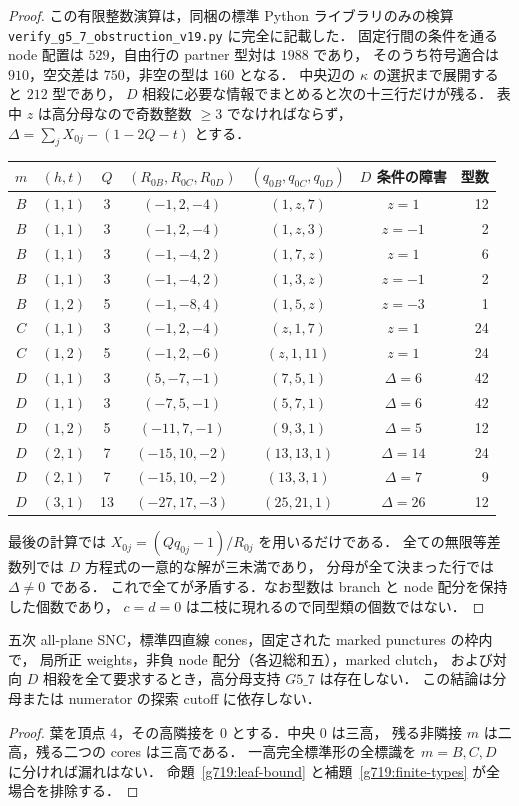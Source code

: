 \begin{proof}
この有限整数演算は，同梱の標準 Python ライブラリのみの検算
\nolinkurl{verify_g5_7_obstruction_v19.py} に完全に記載した．
固定行間の条件を通る node 配置は $529$，自由行の partner 型対は $1988$ であり，
そのうち符号適合は $910$，空交差は $750$，非空の型は $160$ となる．
中央辺の $\kappa$ の選択まで展開すると $212$ 型であり，
$D$ 相殺に必要な情報でまとめると次の十三行だけが残る．
表中 $z$ は高分母なので奇数整数 $\ge3$ でなければならず，
$\Delta=\sum_jX_{0j}-(1-2Q-t)$ とする．
\begin{center}
\small
\begin{tabular}{c|c|c|c|c|c|r}
$m$&$(h,t)$&$Q$&$(R_{0B},R_{0C},R_{0D})$&$(q_{0B},q_{0C},q_{0D})$&$D$ 条件の障害&型数\\\hline
$B$&$(1,1)$&3&$(-1,2,-4)$&$(1,z,7)$&$z=1$&12\\
$B$&$(1,1)$&3&$(-1,2,-4)$&$(1,z,3)$&$z=-1$&2\\
$B$&$(1,1)$&3&$(-1,-4,2)$&$(1,7,z)$&$z=1$&6\\
$B$&$(1,1)$&3&$(-1,-4,2)$&$(1,3,z)$&$z=-1$&2\\
$B$&$(1,2)$&5&$(-1,-8,4)$&$(1,5,z)$&$z=-3$&1\\
$C$&$(1,1)$&3&$(-1,2,-4)$&$(z,1,7)$&$z=1$&24\\
$C$&$(1,2)$&5&$(-1,2,-6)$&$(z,1,11)$&$z=1$&24\\
$D$&$(1,1)$&3&$(5,-7,-1)$&$(7,5,1)$&$\Delta=6$&42\\
$D$&$(1,1)$&3&$(-7,5,-1)$&$(5,7,1)$&$\Delta=6$&42\\
$D$&$(1,2)$&5&$(-11,7,-1)$&$(9,3,1)$&$\Delta=5$&12\\
$D$&$(2,1)$&7&$(-15,10,-2)$&$(13,13,1)$&$\Delta=14$&24\\
$D$&$(2,1)$&7&$(-15,10,-2)$&$(13,3,1)$&$\Delta=7$&9\\
$D$&$(3,1)$&13&$(-27,17,-3)$&$(25,21,1)$&$\Delta=26$&12
\end{tabular}
\end{center}
最後の計算では $X_{0j}=(Qq_{0j}-1)/R_{0j}$ を用いるだけである．
全ての無限等差数列では $D$ 方程式の一意的な解が三未満であり，
分母が全て決まった行では $\Delta\ne0$ である．
これで全てが矛盾する．なお型数は branch と node 配分を保持した個数であり，
$c=d=0$ は二枝に現れるので同型類の個数ではない．
\end{proof}

\begin{theorem}[$G5\_7$ の無上界排除]
\label{g719:no-G5-7}
五次 all-plane SNC，標準四直線 cones，固定された marked punctures の枠内で，
局所正 weights，非負 node 配分（各辺総和五），marked clutch，
および対向 $D$ 相殺を全て要求するとき，高分母支持 $G5\_7$ は存在しない．
この結論は分母または numerator の探索 cutoff に依存しない．
\end{theorem}
\begin{proof}
葉を頂点 $4$，その高隣接を $0$ とする．中央 $0$ は三高，
残る非隣接 $m$ は二高，残る二つの cores は三高である．
一高完全標準形の全標識を $m=B,C,D$ に分ければ漏れはない．
命題~\ref{g719:leaf-bound} と補題~\ref{g719:finite-types} が全場合を排除する．
\end{proof}
